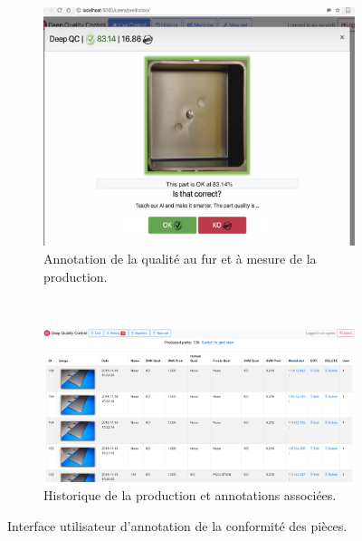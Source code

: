 \begin{figure}[hbt!]
	\centering
	\begin{subfigure}[c]{0.60\textwidth}
		\includegraphics[width=\textwidth]{../Chap5/Figures/annotation_hmi.jpg}
		\caption{Annotation de la qualité au fur et à mesure de la production.}
	\end{subfigure}
	\\
	\bigskip
	\begin{subfigure}[c]{0.60\textwidth}
		\includegraphics[width=\textwidth,height=\textheight,keepaspectratio]{../Chap5/Figures/Capture-2018-11-21-15-10-59.png}
		\caption{Historique de la production et annotations associées.}
		\vspace*{5mm}
	\end{subfigure}
	\caption{Interface utilisateur d'annotation de la conformité des pièces.}
	\label{fig:hmi}
\end{figure}


